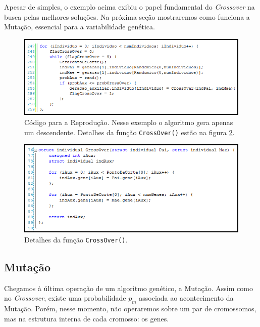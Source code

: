 	Apesar de simples, o exemplo acima exibiu o papel fundamental do \textit{Crossover} na busca pelas melhores soluções. Na próxima seção mostraremos como funciona a Mutação, essencial para a variabilidade genética. 
	
	\begin{figure}[htp]
		\begin{center}
			\includegraphics[width=13cm]{figs/ga/CodigoLoopCrossOver.png}
		\end{center}
		\caption{\label{figCodLoopCrossOver} Código para a Reprodução. Nesse exemplo o algoritmo gera apenas um descendente. Detalhes da função \texttt{CrossOver()} estão na figura \ref{figCodCrossOver}.}
	\end{figure}

\begin{figure}[htp]
		\begin{center}
			\includegraphics[width=13cm]{figs/ga/CodigoCrossOver.png}
		\end{center}
		\caption{\label{figCodCrossOver}Detalhes da função \texttt{CrossOver()}.}
	\end{figure}
	
	\subsection{\label{mutacao}Mutação}
		
	Chegamos à última operação de um algoritmo genético, a Mutação. Assim como no \textit{Crossover}, existe uma probabilidade $p_m$ associada ao acontecimento da Mutação. Porém, nesse momento, não operaremos sobre um par de cromossomos, mas na estrutura interna de cada cromosso: os genes.
	
